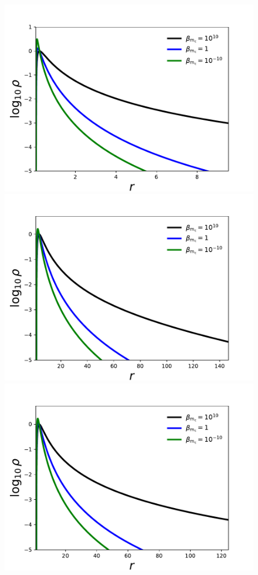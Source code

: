 \documentclass[twocolumn,aps,showpacs,showkeys,prd,superscriptaddress,byrevtex, amsmath]{revtex4-1}
\begin{document}
\begin{figure}
\hspace{-0.6cm}
\\
\hspace{-0.6cm}
\includegraphics[scale=0.37]{figures/log_radial_log_rho_I_ADM.pdf}
\hspace{-0.6cm}
\includegraphics[scale=0.37]{figures/log_radial_log_rho_IV_ADM.pdf}
\hspace{-0.6cm}
\includegraphics[scale=0.37]{figures/log_radial_log_rho_VII_ADM.pdf}

\end{figure}
\end{document}
